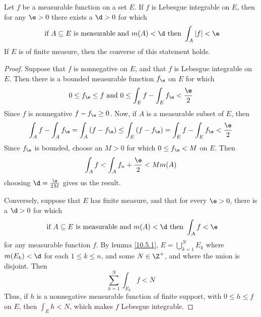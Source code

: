 \begin{lemma}\label{10.5.2}
    Let $f$ be a measurable function on a set $E$. If  $f$ is Lebesgue integrable
    on $E$, then for any  $\e>0$ there exists a  $\d>0$ for which
     \begin{equation*}
         \text{ if } A \subseteq E \text{ is measurable and }
         m(A)<\d \text{ then } \int_A{|f|}<\e
     \end{equation*}
     If $E$ is of finite measure, then the converse of this statement holds.
\end{lemma}
\begin{proof}
    Suppose that $f$ is nonnegative on  $E$, and that  $f$ is Lebesgue
    integrable on  $E$. Then there is a bounded measurable function $f_\e$ on
    $E$ for which
    \begin{equation*}
        0 \leq f_\e \leq f \text{ and } 0 \leq \int_E{f}-\int_E{f_\e}<\frac{\e}{2}
    \end{equation*}
    Since $f$ is nonnegative  $f-f_\e \geq 0$. Now, if  $A$ is a measurable
    subset of  $E$, then
    \begin{equation*}
        \int_A{f}-\int_A{f_\e}=\int_A{(f-f_\e)} \leq \int_E{(f-f_\e)}=
        \int_E{f}-\int_E{f_\e}<\frac{\e}{2}
    \end{equation*}
    Since $f_\e$ is bounded, choose an $M>0$ for which $0 \leq f_\e<M$ on $E$.
    Then
    \begin{equation*}
        \int_A{f}<\int_A{f_n}+\frac{\e}{2}<Mm(A)
    \end{equation*}
    choosing $\d=\frac{\e}{2M}$ gives us the result.

    Conversely, suppose that $E$ has finite measure, and that for every $\e>0$,
    there is a $\d>0$ for which
     \begin{equation*}
         \text{ if } A \subseteq E \text{ is measurable and }
         m(A)<\d \text{ then } \int_A{f}<\e
     \end{equation*}
     for any measurable function $f$. By lemma \ref {10.5.1},
     $E=\bigcup_{k=1}^N{E_k}$ where $m(E_k)<\d$ for each $1 \leq k \leq n$, and
     some $N \in \Z^+$, and where the union is disjoint. Then
     \begin{equation*}
         \sum_{k=1}^N{\int_{E_k}{f}}<N
     \end{equation*}
     Thus, if $h$ is a nonnegative measurable function of finite support, with
     $0 \leq h \leq f$ on  $E$, then  $\int_E{h}<N$, which makes $f$ Lebesgue
     integrable.
\end{proof}

